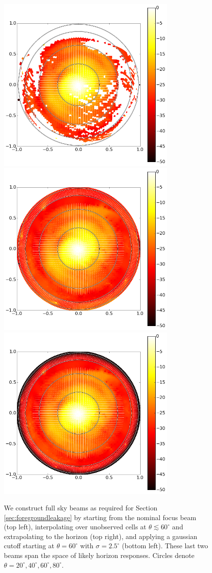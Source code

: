 \documentclass[preprint]{aastex}
\begin{document}
\begin{figure}[h]
\includegraphics[width=3.5in]{measbeam_raw.png}
\includegraphics[width=3.5in]{measbeam_interp.png}
\includegraphics[width=3.5in]{measbeam_interp_expcutoff.png}
\caption{We construct full sky beams as required for Section \ref{sec:foregroundleakage} by starting from the nominal focus beam (top left), interpolating over unobserved cells at $\theta\lesssim60^\circ$ and extrapolating to the horizon (top right), and applying a gaussian cutoff starting at $\theta=60^\circ$ with $\sigma=2.5^\circ$ (bottom left). These last two beams span the space of likely horizon responses. Circles denote $\theta=20^\circ,40^\circ,60^\circ,80^\circ$.}
\label{fig:interpbeams}
\end{figure}
\end{document}
